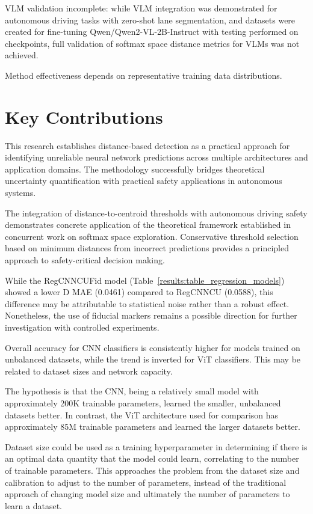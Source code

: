VLM validation incomplete: while VLM integration was demonstrated for autonomous driving tasks with zero-shot lane segmentation, and datasets were created for fine-tuning Qwen/Qwen2-VL-2B-Instruct with testing performed on checkpoints, full validation of softmax space distance metrics for VLMs was not achieved.

Method effectiveness depends on representative training data distributions.

\section{Key Contributions}

This research establishes distance-based detection as a practical approach for identifying unreliable neural network predictions across multiple architectures and application domains. The methodology successfully bridges theoretical uncertainty quantification with practical safety applications in autonomous systems.

The integration of distance-to-centroid thresholds with autonomous driving safety demonstrates concrete application of the theoretical framework established in concurrent work on softmax space exploration. Conservative threshold selection based on minimum distances from incorrect predictions provides a principled approach to safety-critical decision making.

While the RegCNNCUFid model (Table~\ref{results:table_regression_models}) showed a lower D MAE (0.0461) compared to RegCNNCU (0.0588), this difference may be attributable to statistical noise rather than a robust effect. Nonetheless, the use of fiducial markers remains a possible direction for further investigation with controlled experiments.

Overall accuracy for CNN classifiers is consistently higher for models trained on unbalanced datasets, while the trend is inverted for ViT classifiers. This may be related to dataset sizes and network capacity.

The hypothesis is that the CNN, being a relatively small model with approximately 200K trainable parameters, learned the smaller, unbalanced datasets better. In contrast, the ViT architecture used for comparison has approximately 85M trainable parameters and learned the larger datasets better.

Dataset size could be used as a training hyperparameter in determining if there is an optimal data quantity that the model could learn, correlating to the number of trainable parameters. This approaches the problem from the dataset size and calibration to adjust to the number of parameters, instead of the traditional approach of changing model size and ultimately the number of parameters to learn a dataset.
